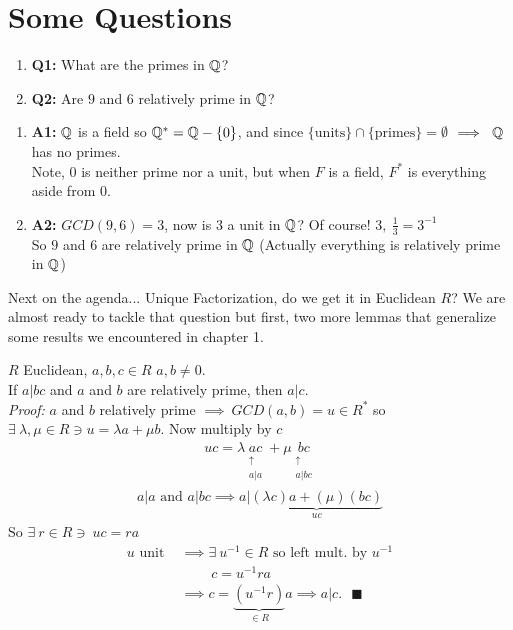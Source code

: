 \section*{Some Questions}
\begin{enumerate}
    \item \textbf{Q1:} What are the primes in ${\mathbb{Q}}$?
    \item \textbf{Q2:} Are $9$ and $6$ relatively prime in ${\mathbb{Q}}$?
\end{enumerate}
\vspace{0.25in}
\begin{enumerate}
    \item \textbf{A1:} ${\mathbb{Q}}$ is a field so ${\mathbb{Q}}^*={\mathbb{Q}}-\{0\}$, and since
    $\{\text{units}\}\cap \{\text{primes}\} =\emptyset$ $\implies \ {\mathbb{Q}}$ has no primes. \\
    Note, $0$ is neither prime nor a unit, but when $F$ is a field, $F^*$ is everything aside from
    $0$.
    \item \textbf{A2:} $GCD(9,6)=3$, now is $3$ a unit in ${\mathbb{Q}}$? Of course! $3,\ \frac{1}{3}=3^{-1}$
    \\
    So $9$ and $6$ are relatively prime in ${\mathbb{Q}}$ (Actually everything is relatively prime in ${\mathbb{Q}}$)
\end{enumerate}
\vspace{0.2in}
\noindent Next on the agenda... Unique Factorization, do we get it in Euclidean $R$? We are almost
ready to tackle that question but first, two more lemmas that generalize some results we encountered
in chapter 1.
\begin{lemma}
    $R$ Euclidean, $a,b,c \in R$ $a,b \neq 0$.\\
If $a | bc$  and $a$ and $b$ are relatively prime, then $a|c$. \\

\noindent \textit{Proof: } $a$ and $b$ relatively prime $\implies \ GCD(a,b)=u \in R^*$ so
$\exists \ \lambda, \mu \in R \ni u=\lambda a + \mu b$. Now multiply by $c$
\begin{align*}
    uc = \lambda \underset{\substack{\uparrow \\ a|a}}{ac} + \mu \underset{\substack{\uparrow \\ a|bc}}{bc}
\end{align*}
\begin{align*}
    a|a \text{ and }a|bc \implies a | \underbrace{(\lambda c)a+ (\mu)(bc)}_{uc}
\end{align*}
So $\exists \ r\in R \ni \ uc=ra$
\begin{align*}
    u \text{ unit } & \implies \exists \ u^{-1}\in R \text{ so left mult. by }u^{-1} \\
    & \ \ \ \ \ \ \ \ \ \ c=u^{-1}ra \\
    &\implies c= \underbrace{(u^{-1}r)}_{\in R} a \implies a|c.  \ \ \ \blacksquare
\end{align*}
\end{lemma}

